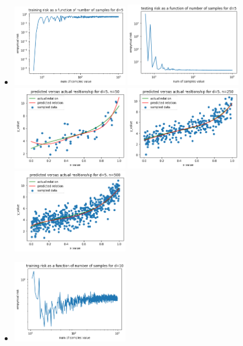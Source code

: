 \documentclass{article}
\begin{document}
\begin{enumerate}
\begin{itemize}
              \item          \includegraphics[width=5cm]{homework/homework_1/training_d_5.png}
            \includegraphics[width=5cm]{homework/homework_1/test_d_5.png}
             \includegraphics[width=5cm]{homework/homework_1/d_5_1.png}
             \includegraphics[width=5cm]{homework/homework_1/d_5_2.png}
            \includegraphics[width=5cm]{homework/homework_1/d_5_3.png}
            \item
                        \includegraphics[width=5cm]{homework/homework_1/training_d_10.png}

\end{itemize}
\end{enumerate}
\end{document}
